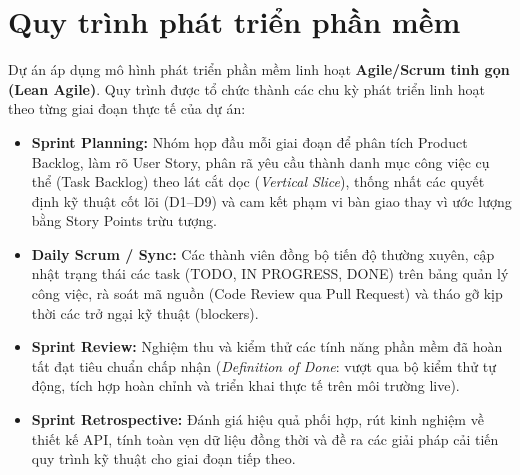 \documentclass[12pt,a4paper,oneside]{report}
\begin{document}
\section{Quy trình phát triển phần mềm}
Dự án áp dụng mô hình phát triển phần mềm linh hoạt \textbf{Agile/Scrum tinh gọn (Lean Agile)}. Quy trình được tổ chức thành các chu kỳ phát triển linh hoạt theo từng giai đoạn thực tế của dự án:
\begin{itemize}
    \item \textbf{Sprint Planning:} Nhóm họp đầu mỗi giai đoạn để phân tích Product Backlog, làm rõ User Story, phân rã yêu cầu thành danh mục công việc cụ thể (Task Backlog) theo lát cắt dọc (\textit{Vertical Slice}), thống nhất các quyết định kỹ thuật cốt lõi (D1--D9) và cam kết phạm vi bàn giao thay vì ước lượng bằng Story Points trừu tượng.
    \item \textbf{Daily Scrum / Sync:} Các thành viên đồng bộ tiến độ thường xuyên, cập nhật trạng thái các task (TODO, IN PROGRESS, DONE) trên bảng quản lý công việc, rà soát mã nguồn (Code Review qua Pull Request) và tháo gỡ kịp thời các trở ngại kỹ thuật (blockers).
    \item \textbf{Sprint Review:} Nghiệm thu và kiểm thử các tính năng phần mềm đã hoàn tất đạt tiêu chuẩn chấp nhận (\textit{Definition of Done}: vượt qua bộ kiểm thử tự động, tích hợp hoàn chỉnh và triển khai thực tế trên môi trường live).
    \item \textbf{Sprint Retrospective:} Đánh giá hiệu quả phối hợp, rút kinh nghiệm về thiết kế API, tính toàn vẹn dữ liệu đồng thời và đề ra các giải pháp cải tiến quy trình kỹ thuật cho giai đoạn tiếp theo.
\end{itemize}
\end{document}
